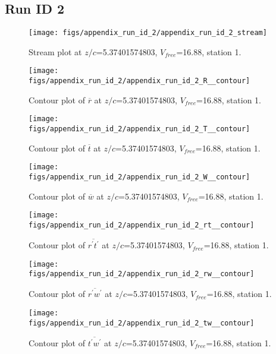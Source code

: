 \subsection{Run ID 2}
\begin{figure}[H]
\centering
\texttt{[image: figs/appendix\_run\_id\_2/appendix\_run\_id\_2\_stream]}
\caption{Stream plot at $z/c$=5.37401574803, $V_{free}$=16.88, station 1.}
\label{fig:appendix_run_id_2_stream}
\end{figure}


\begin{figure}[H]
\centering
\texttt{[image: figs/appendix\_run\_id\_2/appendix\_run\_id\_2\_R\_\_contour]}
\caption{Contour plot of $\overline{r}$ at $z/c$=5.37401574803, $V_{free}$=16.88, station 1.}
\label{fig:appendix_run_id_2_R__contour}
\end{figure}


\begin{figure}[H]
\centering
\texttt{[image: figs/appendix\_run\_id\_2/appendix\_run\_id\_2\_T\_\_contour]}
\caption{Contour plot of $\overline{t}$ at $z/c$=5.37401574803, $V_{free}$=16.88, station 1.}
\label{fig:appendix_run_id_2_T__contour}
\end{figure}


\begin{figure}[H]
\centering
\texttt{[image: figs/appendix\_run\_id\_2/appendix\_run\_id\_2\_W\_\_contour]}
\caption{Contour plot of $\overline{w}$ at $z/c$=5.37401574803, $V_{free}$=16.88, station 1.}
\label{fig:appendix_run_id_2_W__contour}
\end{figure}


\begin{figure}[H]
\centering
\texttt{[image: figs/appendix\_run\_id\_2/appendix\_run\_id\_2\_rt\_\_contour]}
\caption{Contour plot of $\overline{r^\prime t^\prime}$ at $z/c$=5.37401574803, $V_{free}$=16.88, station 1.}
\label{fig:appendix_run_id_2_rt__contour}
\end{figure}


\begin{figure}[H]
\centering
\texttt{[image: figs/appendix\_run\_id\_2/appendix\_run\_id\_2\_rw\_\_contour]}
\caption{Contour plot of $\overline{r^\prime w^\prime}$ at $z/c$=5.37401574803, $V_{free}$=16.88, station 1.}
\label{fig:appendix_run_id_2_rw__contour}
\end{figure}


\begin{figure}[H]
\centering
\texttt{[image: figs/appendix\_run\_id\_2/appendix\_run\_id\_2\_tw\_\_contour]}
\caption{Contour plot of $\overline{t^\prime w^\prime}$ at $z/c$=5.37401574803, $V_{free}$=16.88, station 1.}
\label{fig:appendix_run_id_2_tw__contour}
\end{figure}



